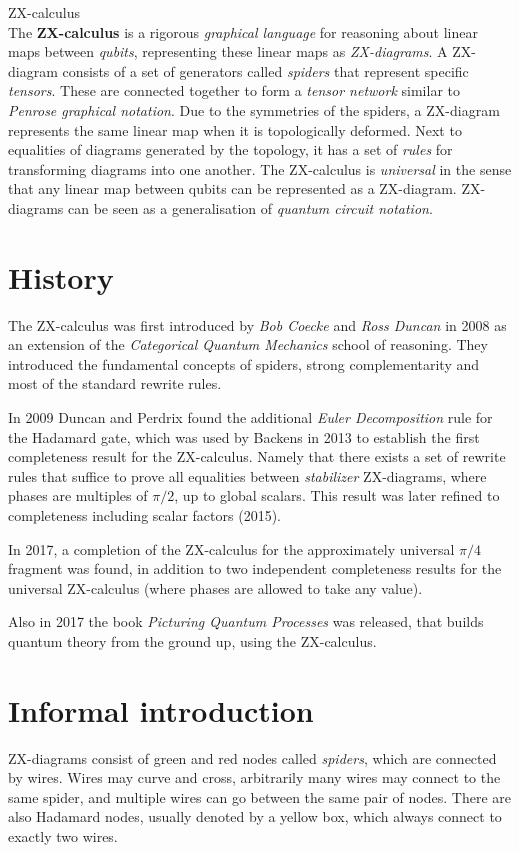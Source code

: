 \documentclass[a4paper, 12pt]{article}
\begin{document}
{\Huge ZX-calculus} \\

The \textbf{ZX-calculus} is a rigorous \emph{graphical language} for reasoning about linear maps between \emph{qubits}, representing these linear maps as \emph{ZX-diagrams}. A ZX-diagram consists of a set of generators called \emph{spiders} that represent specific \emph{tensors}. These are connected together to form a \emph{tensor network} similar to \emph{Penrose graphical notation}. Due to the symmetries of the spiders, a ZX-diagram represents the same linear map when it is topologically deformed. Next to equalities of diagrams generated by the topology, it has a set of \emph{rules} for transforming diagrams into one another. The ZX-calculus is \emph{universal} in the sense that any linear map between qubits can be represented as a ZX-diagram. ZX-diagrams can be seen as a generalisation of \emph{quantum circuit notation}.

\section{History}
The ZX-calculus was first introduced by \emph{Bob Coecke} and \emph{Ross Duncan} in 2008 as an extension of the \emph{Categorical Quantum Mechanics} school of reasoning. They introduced the fundamental concepts of spiders, strong complementarity and most of the standard rewrite rules.

In 2009 Duncan and Perdrix found the additional \emph{Euler Decomposition} rule for the Hadamard gate, which was used by Backens in 2013 to establish the first completeness result for the ZX-calculus. Namely that there exists a set of rewrite rules that suffice to prove all equalities between \emph{stabilizer} ZX-diagrams, where phases are multiples of $\pi/2$, up to global scalars. This result was later refined to completeness including scalar factors (2015).

In 2017, a completion of the ZX-calculus for the approximately universal $\pi/4$ fragment was found, in addition to two independent completeness results for the universal ZX-calculus (where phases are allowed to take any value).

Also in 2017 the book \emph{Picturing Quantum Processes} was released, that builds quantum theory from the ground up, using the ZX-calculus.


\section{Informal introduction}
ZX-diagrams consist of green and red nodes called \emph{spiders}, which are connected by wires. Wires may curve and cross, arbitrarily many wires may connect to the same spider, and multiple wires can go between the same pair of nodes. There are also Hadamard nodes, usually denoted by a yellow box, which always connect to exactly two wires.
\end{document}
